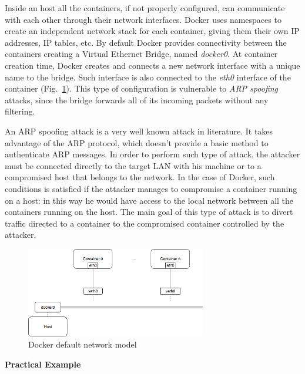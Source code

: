 \documentclass[a4paper,12pt]{article}
\def\myfig#1{Fig.~#1\xspace}
\begin{document}
Inside an host all the containers, if not properly configured, can communicate
with each other through their network interfaces. Docker uses namespaces to
create an independent network stack for each container, giving them their own IP
addresses, IP tables, etc. By default Docker provides connectivity between the
containers creating a Virtual Ethernet Bridge, named \textit{docker0}. At
container creation time, Docker creates and connects a new network interface with
a unique name to the bridge. Such interface is also connected to the
\textit{eth0} interface of the
container (\myfig{\ref{fig:docker_network_model}}). This type of configuration is
vulnerable to \textit{ARP spoofing} attacks, since the bridge forwards all of
its incoming packets without any filtering. \par An ARP spoofing attack is a
very well known attack in literature. It takes advantage of the ARP protocol,
which doesn't provide a basic method to authenticate ARP messages. In order to
perform such type of attack, the attacker must be connected directly to the
target LAN with his machine or to a compromised host that belongs to the
network. In the case of Docker, such conditions is satisfied if the attacker
manages to compromise a container running on a host: in this way he would have
access to the local network between all the containers running on the host. The
main goal of this type of attack is to divert traffic directed to a container to
the compromised container controlled by the attacker.   
\begin{figure}[ht!]
  \centerline{\includegraphics[width=0.7\textwidth]{docker-network-model.png}}
  \caption{Docker default network model}
  \label{fig:docker_network_model}
  \end{figure}

\bigbreak\textbf{Practical Example}\bigbreak 
\label{sec:arpspoof_description}
\end{document}
